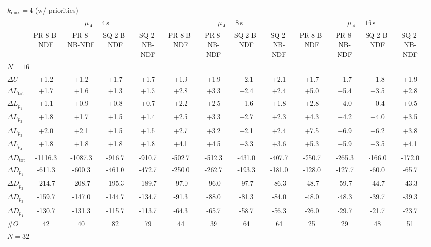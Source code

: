 \begin{tabular}{l c c c c c c c c c c c c}
\toprule
\multicolumn{13}{l}{$k_{\max}=4$ (w/ priorities)} \\
\addlinespace[0.2em]
 & \multicolumn{4}{c}{$\mu_A=4\,\mathrm{s}$} & \multicolumn{4}{c}{$\mu_A=8\,\mathrm{s}$} & \multicolumn{4}{c}{$\mu_A=16\,\mathrm{s}$} \\
\cmidrule(lr){2-5}\cmidrule(lr){6-9}\cmidrule(lr){10-13}
 & PR-8-B-NDF & PR-8-NB-NDF & SQ-2-B-NDF & SQ-2-NB-NDF & PR-8-B-NDF & PR-8-NB-NDF & SQ-2-B-NDF & SQ-2-NB-NDF & PR-8-B-NDF & PR-8-NB-NDF & SQ-2-B-NDF & SQ-2-NB-NDF \\
\midrule
\multicolumn{13}{l}{${N=16}$} \\
\midrule
$\Delta U$ & +1.2 & +1.2 & +1.7 & +1.7 & +1.9 & +1.9 & +2.1 & +2.1 & +1.7 & +1.7 & +1.8 & +1.9 \\
$\Delta L_{\mathrm{tot}}$ & +1.7 & +1.6 & +1.3 & +1.3 & +2.8 & +3.3 & +2.4 & +2.4 & +5.0 & +5.4 & +3.5 & +2.8 \\
$\Delta L_{p_1}$ & +1.1 & +0.9 & +0.8 & +0.7 & +2.2 & +2.5 & +1.6 & +1.8 & +2.8 & +4.0 & +0.4 & +0.5 \\
$\Delta L_{p_2}$ & +1.8 & +1.7 & +1.5 & +1.4 & +2.5 & +3.3 & +2.7 & +2.3 & +4.3 & +4.2 & +4.0 & +3.5 \\
$\Delta L_{p_3}$ & +2.0 & +2.1 & +1.5 & +1.5 & +2.7 & +3.2 & +2.1 & +2.4 & +7.5 & +6.9 & +6.2 & +3.8 \\
$\Delta L_{p_4}$ & +1.8 & +1.8 & +1.8 & +1.8 & +4.1 & +4.5 & +3.3 & +3.6 & +5.3 & +5.9 & +3.5 & +4.1 \\
$\Delta D_{\mathrm{tot}}$ & -1116.3 & -1087.3 & -916.7 & -910.7 & -502.7 & -512.3 & -431.0 & -407.7 & -250.7 & -265.3 & -166.0 & -172.0 \\
$\Delta D_{p_1}$ & -611.3 & -600.3 & -461.0 & -472.7 & -250.0 & -262.7 & -193.3 & -181.0 & -128.0 & -127.7 & -60.0 & -65.7 \\
$\Delta D_{p_2}$ & -214.7 & -208.7 & -195.3 & -189.7 & -97.0 & -96.0 & -97.7 & -86.3 & -48.7 & -59.7 & -44.7 & -43.3 \\
$\Delta D_{p_3}$ & -159.7 & -147.0 & -144.7 & -134.7 & -91.3 & -88.0 & -81.3 & -84.0 & -48.0 & -48.3 & -39.7 & -39.3 \\
$\Delta D_{p_4}$ & -130.7 & -131.3 & -115.7 & -113.7 & -64.3 & -65.7 & -58.7 & -56.3 & -26.0 & -29.7 & -21.7 & -23.7 \\
$\#O$ & 42 & 40 & 82 & 79 & 44 & 39 & 64 & 64 & 25 & 29 & 48 & 51 \\
\midrule
\multicolumn{13}{l}{${N=32}$} \\

\end{tabular}
